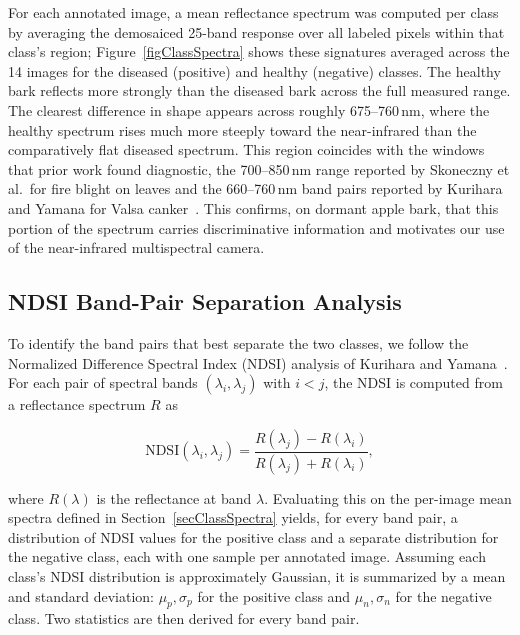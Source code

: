 For each annotated image, a mean reflectance spectrum was computed
per class by averaging the demosaiced 25-band response over all
labeled pixels within that class's region;
Figure~\ref{figClassSpectra} shows these signatures averaged across
the 14 images for the diseased (positive) and healthy (negative)
classes.
The healthy bark reflects more strongly than the diseased bark
across the full measured range.
The clearest difference in shape appears across roughly
675--760\,nm, where the healthy spectrum rises much more steeply
toward the near-infrared than the comparatively flat diseased
spectrum.
This region coincides with the windows that prior work found
diagnostic, the 700--850\,nm range reported by Skoneczny et al.\
for fire blight on leaves and the 660--760\,nm band pairs reported
by Kurihara and Yamana for Valsa
canker~\cite{Skoneczny2020DetectionFireBlightAppleHyperspectralLeaf,
Kurihara2022DetectionValsaCankerHyperspectralCanker}. This confirms,
on dormant apple bark, that this portion of the spectrum carries
discriminative information and motivates our use of the
near-infrared multispectral camera.

\iffalse
\subsection{NDSI Band-Pair Separation Analysis} \label{secNDSI}

To identify the band pairs that best separate the two classes, we
follow the Normalized Difference Spectral Index (NDSI) analysis of
Kurihara and
Yamana~\cite{Kurihara2022DetectionValsaCankerHyperspectralCanker}.
For each pair of spectral bands $(\lambda_i, \lambda_j)$ with
$i < j$, the NDSI is computed from a reflectance spectrum $R$ as

\begin{equation}
    \mathrm{NDSI}(\lambda_i, \lambda_j) =
    \frac{R(\lambda_j) - R(\lambda_i)}{R(\lambda_j) + R(\lambda_i)},
\end{equation}

\noindent where $R(\lambda)$ is the reflectance at band $\lambda$.
Evaluating this on the per-image mean spectra defined in
Section~\ref{secClassSpectra} yields, for every band pair, a
distribution of NDSI values for the positive class and a separate
distribution for the negative class, each with one sample per
annotated image.
Assuming each class's NDSI distribution is approximately Gaussian,
it is summarized by a mean and standard deviation: $\mu_p, \sigma_p$
for the positive class and $\mu_n, \sigma_n$ for the negative class.
Two statistics are then derived for every band pair.

